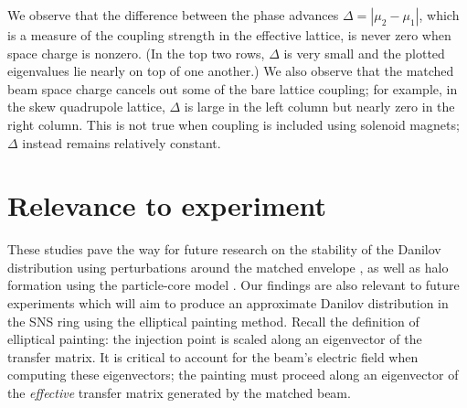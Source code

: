 %
We observe that the difference between the phase advances $\Delta = |\mu_2 - \mu_1|$, which is a measure of the coupling strength in the effective lattice, is never zero when space charge is nonzero. (In the top two rows, $\Delta$ is very small and the plotted eigenvalues lie nearly on top of one another.) We also observe that the matched beam space charge cancels out some of the bare lattice coupling; for example, in the skew quadrupole lattice, $\Delta$ is large in the left column but nearly zero in the right column. This is not true when coupling is included using solenoid magnets; $\Delta$ instead remains relatively constant.  


\section{Relevance to experiment}

These studies pave the way for future research on the stability of the Danilov distribution using perturbations around the matched envelope \cite{Goswami2016}, as well as halo formation using the particle-core model \cite{Wangler1998, Gluckstern1994, Gluckstern1998}. Our findings are also relevant to future experiments which will aim to produce an approximate Danilov distribution in the SNS ring using the elliptical painting method. Recall the definition of elliptical painting: the injection point is scaled along an eigenvector of the transfer matrix. It is critical to account for the beam's electric field when computing these eigenvectors; the painting must proceed along an eigenvector of the \textit{effective} transfer matrix generated by the matched beam.

